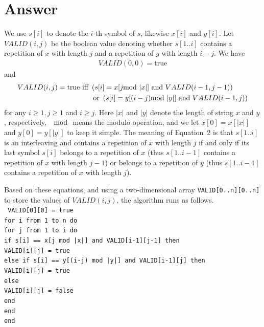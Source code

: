 \documentclass[12pt,letterpaper]{article}
\begin{document}
\section*{Answer}
We use $s[i]$ to denote the $i$-th symbol of $s$, likewise $x[i]$ and $y[i]$. Let $VALID(i,j)$ be the boolean value denoting whether $s[1..i]$ contains a repetition of $x$ with length $j$ and a repetition of $y$ with length $i-j$. We have
\begin{align}
VALID(0,0) = \textrm{true}
\end{align}
and
\begin{align}
\nonumber VALID(i,j) = \textrm{true iff } & \left(s[i] = x[j\hspace{-.7em}\mod |x|]\textrm{ and }VALID(i-1,j-1)\right)\\
& \textrm{ or } \left(s[i] = y[(i-j)\hspace{-.7em}\mod |y|]\textrm{ and }VALID(i-1,j)\right)
\end{align}
for any $i\ge 1, j\ge 1$ and $i\ge j$. Here $|x|$ and $|y|$ denote the length of string $x$ and $y$, respectively, \hspace{-.7em}$\mod$\hspace{-.3em} means the modulo operation, and we let $x[0]=x[|x|]$ and $y[0]=y[|y|]$ to keep it simple. The meaning of Equation~2 is that $s[1..i]$ is an interleaving and contains a repetition of $x$ with length $j$ if and only if its last symbol $s[i]$ belongs to a repetition of $x$ (thus $s[1..i-1]$ contains a repetition of $x$ with length $j-1$) or belongs to a repetition of $y$ (thus $s[1..i-1]$ contains a repetition of $x$ with length $j$).

Based on these equations, and using a two-dimensional array \texttt{VALID[0..n][0..n]} to store the values of $VALID(i,j)$, the algorithm runs as follows.
\\
\tt
VALID[0][0] = true\\
for i from 1 to n do\\
\mbox{\hspace{2em}}for j from 1 to i do\\
\mbox{\hspace{4em}}if s[i] == x[j mod |x|] and VALID[i-1][j-1] then\\
\mbox{\hspace{6em}}VALID[i][j] = true\\
\mbox{\hspace{4em}}else if s[i] == y[(i-j) mod |y|] and VALID[i-1][j] then\\
\mbox{\hspace{6em}}VALID[i][j] = true\\
\mbox{\hspace{4em}}else\\
\mbox{\hspace{6em}}VALID[i][j] = false\\
\mbox{\hspace{4em}}end\\
\mbox{\hspace{2em}}end\\
end\\
\rm
\end{document}
